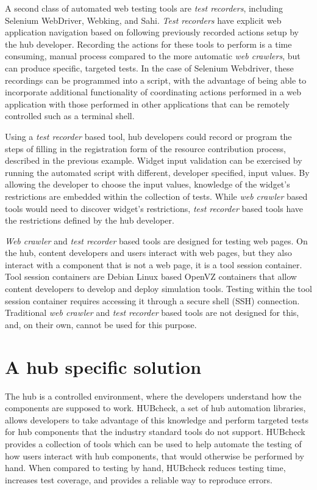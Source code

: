\documentclass[letterpaper]{scrartcl}
\begin{document}
A second class of automated web testing tools are \textit{test recorders},
including Selenium WebDriver, Webking, and Sahi. \textit{Test recorders} have
explicit web application navigation based on following previously recorded
actions setup by the hub developer. Recording the actions for these
tools to perform is a time consuming, manual process compared to the more
automatic \textit{web crawlers}, but can produce specific, targeted tests.
In the case of Selenium Webdriver, these recordings can be programmed into a
script, with the advantage of being able to incorporate additional
functionality of coordinating actions performed in a web application with those
performed in other applications that can be remotely controlled such as a
terminal shell.

Using a \textit{test recorder} based tool, hub developers could record or
program the steps of filling in the registration form of the resource
contribution process, described in the previous example. Widget input
validation can be exercised by running the automated script with different,
developer specified, input values.  By allowing the developer to choose the
input values, knowledge of the widget's restrictions are embedded within the
collection of tests. While \textit{web crawler} based tools would need to
discover widget's restrictions, \textit{test recorder} based tools have the
restrictions defined by the hub developer.

\textit{Web crawler} and \textit{test recorder} based tools are designed for
testing web pages. On the hub, content developers and users interact with web
pages, but they also interact with a component that is not a web page, it is a
tool session container. Tool session containers are Debian Linux based OpenVZ
containers that allow content developers to develop and deploy simulation
tools. Testing within the tool session container requires accessing it through
a secure shell (SSH) connection. Traditional \textit{web crawler} and
\textit{test recorder} based tools are not designed for this, and, on their
own, cannot be used for this purpose.


\section{A hub specific solution}

The hub is a controlled environment, where the developers understand how the
components are supposed to work. HUBcheck, a set of hub automation libraries,
allows developers to take advantage of this knowledge and perform targeted
tests for hub components that the industry standard tools do not support.
HUBcheck provides a collection of tools which can be used to help automate the
testing of how users interact with hub components, that would otherwise be
performed by hand.  When compared to testing by hand, HUBcheck reduces testing
time, increases test coverage, and provides a reliable way to reproduce errors.
\end{document}
